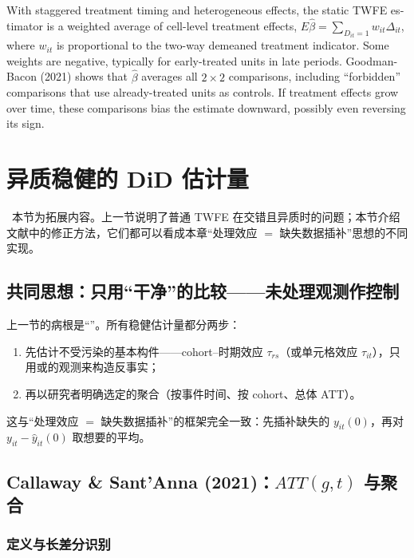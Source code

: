 \begin{english}
With staggered treatment timing and heterogeneous effects, the static TWFE estimator is a weighted average of cell-level treatment effects, $E\hat\beta=\sum_{D_{it}=1}w_{it}\Delta_{it}$, where $w_{it}$ is proportional to the two-way demeaned treatment indicator. Some weights are negative, typically for early-treated units in late periods. Goodman-Bacon (2021) shows that $\hat\beta$ averages all $2\times2$ comparisons, including ``forbidden'' comparisons that use already-treated units as controls. If treatment effects grow over time, these comparisons bias the estimate downward, possibly even reversing its sign.
\end{english}

\section{异质稳健的 DiD 估计量}\label{sec:U15b-robust}

\tagext\ 本节为拓展内容。上一节说明了普通 TWFE 在交错且异质时的问题；本节介绍文献中的修正方法，它们都可以看成本章“处理效应 $=$ 缺失数据插补”思想的不同实现。

\subsection{共同思想：只用“干净”的比较——未处理观测作控制}

上一节的病根是“”。所有稳健估计量都分两步：
\begin{enumerate}
  \item 先估计不受污染的基本构件——cohort--时期效应 $\tau_{rs}$（或单元格效应 $\tau_{it}$），只用或的观测来构造反事实；
  \item 再以研究者明确选定的聚合（按事件时间、按 cohort、总体 ATT）。
\end{enumerate}
这与“处理效应 $=$ 缺失数据插补”的框架完全一致：先插补缺失的 $y_{it}(0)$，再对 $y_{it}-\hat y_{it}(0)$ 取想要的平均。

\subsection{Callaway \& Sant'Anna (2021)：\texorpdfstring{$ATT(g,t)$}{ATT(g,t)} 与聚合}

\subsubsection{定义与长差分识别}

